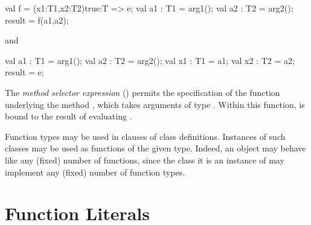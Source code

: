 \begin{xten}
{
  val f = (x1:T1,x2:T2){true}:T => e;
  val a1 : T1 = arg1();
  val a2 : T2 = arg2();
  result = f(a1,a2);
}
\end{xten}
and 
\begin{xten}
{
  val a1 : T1 = arg1();
  val a2 : T2 = arg2();
  {
     val x1 : T1 = a1;
     val x2 : T2 = a2;
     result = e;
  }  
}
\end{xten}






The \emph{method selector expression}  ()
permits the specification of the function underlying
the method , which takes arguments of type .
Within this function,  is bound to the result of evaluating .

Function types may be used in  clauses of class
definitions. Instances of such classes may be used as functions of the
given type.  Indeed, an object may behave like any (fixed) number of
functions, since the class it is an instance of may implement any
(fixed) number of function types.

%


\section{Function Literals}
\label{FunctionLiteral}

